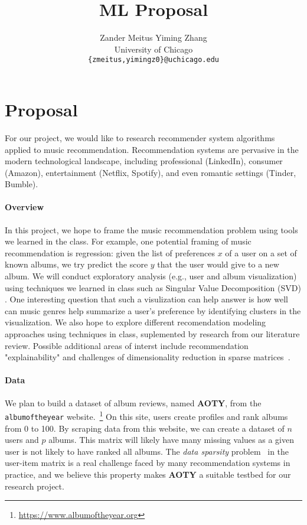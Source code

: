 \documentclass{article}
\title{ML Proposal}
\author{
  Zander Meitus \qquad Yiming Zhang \\
  University of Chicago \\
  \texttt{\{zmeitus,yimingz0\}@uchicago.edu}
}
\newcommand{\aoty}{{\bf AOTY}\xspace}
\begin{document}
\maketitle

\section{Proposal}

For our project, we would like to research recommender system algorithms
 applied to music recommendation.
Recommendation systems are pervasive in the modern technological landscape,
 including professional (LinkedIn), consumer (Amazon), entertainment (Netflix,
 Spotify), and even romantic settings (Tinder, Bumble).

\paragraph{Overview}
In this project, we hope to frame the music recommendation problem
 using tools we learned in the class.
For example, one potential framing of music recommendation is regression: given
 the list of preferences $x$ of a user on a set of known albums, we try predict
 the score $y$ that the user would give to a new album.
We will conduct exploratory analysis (e.g., user and album visualization) using
techniques we learned in class such as Singular Value Decomposition (SVD) .
One interesting question that such a visulization can help answer is how well
 can music genres help summarize a user's preference by identifying clusters in
 the visualization.
We also hope to explore different recomendation modeling approaches using techniques in
 class, suplemented by research from our literature review.
Possible additional areas of interst include recommendation "explainability"
 and challenges of dimensionality reduction in sparse
 matrices~\citep{Afchar_2022,Ling_2021}.

\paragraph*{Data}
We plan to build a dataset of album reviews, named \aoty, from the {\tt
		 albumoftheyear} website.~\footnote{\url{https://www.albumoftheyear.org}} On
 this site, users create profiles and rank albums from 0 to 100.
By scraping data from this website, we can create a dataset of $n$ users and
 $p$ albums.
This matrix will likely have many missing values as a given user is not likely
 to have ranked all albums.
The {\em data sparsity} problem~\citep{suSurveyCollaborativeFiltering2009} in
 the user-item matrix is a real challenge faced by many recommendation systems
 in practice, and we believe this property makes \aoty a suitable testbed for
 our research project.
\end{document}
